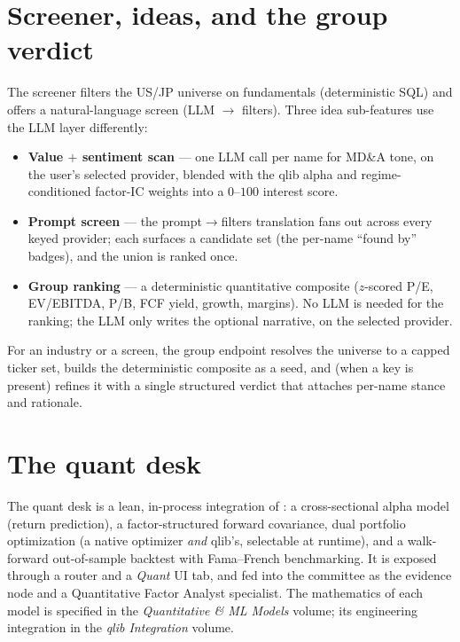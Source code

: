 \documentclass[11pt]{article}
\begin{document}
\section{Screener, ideas, and the group verdict}

The screener filters the US/JP universe on fundamentals (deterministic SQL) and
offers a natural-language screen (LLM $\to$ filters). Three idea sub-features use
the LLM layer differently:

\begin{itemize}
  \item \textbf{Value $+$ sentiment scan} --- one LLM call per name for MD\&A tone,
        on the user's selected provider, blended with the qlib alpha and
        regime-conditioned factor-IC weights into a $0$--$100$ interest score.
  \item \textbf{Prompt screen} --- the prompt$\to$filters translation fans out
        across every keyed provider; each surfaces a candidate set (the per-name
        ``found by'' badges), and the union is ranked once.
  \item \textbf{Group ranking} --- a deterministic quantitative composite
        ($z$-scored P/E, EV/EBITDA, P/B, FCF yield, growth, margins). No LLM is
        needed for the ranking; the LLM only writes the optional narrative, on the
        selected provider.
\end{itemize}

For an industry or a screen, the group endpoint resolves the universe to a capped
ticker set, builds the deterministic composite as a seed, and (when a key is
present) refines it with a single structured verdict that attaches per-name stance
and rationale.

\section{The quant desk}

The quant desk is a lean, in-process integration of : a cross-sectional
alpha model (return prediction), a factor-structured forward covariance, dual
portfolio optimization (a native optimizer \emph{and} qlib's, selectable at
runtime), and a walk-forward out-of-sample backtest with Fama--French
benchmarking. It is exposed through a  router and a \emph{Quant}
UI tab, and fed into the committee as the  evidence node and a
Quantitative Factor Analyst specialist. The mathematics of each model is specified
in the \emph{Quantitative \& ML Models} volume; its engineering integration in the
\emph{qlib Integration} volume.
\end{document}
